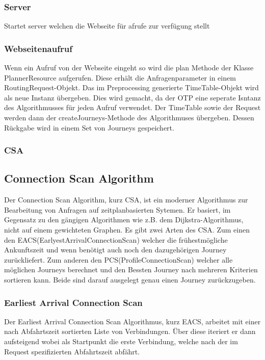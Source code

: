 \subsubsection{Server}
Startet server welchen die Webseite für afrufe zur verfügung stellt
\subsubsection{Webseitenaufruf}
Wenn ein Aufruf von der Webseite eingeht so wird die plan Methode der Klasse PlannerResource aufgerufen. Diese erhält die Anfragenparameter in einem RoutingRequest-Objekt. Das im Preprocessing generierte TimeTable-Objekt wird als neue Instanz übergeben. Dies wird gemacht, da der OTP eine seperate Isntanz des Algorithmusses für jeden Aufruf verwendet. Der TimeTable sowie der Request werden dann der createJourneys-Methode des Algorithmuses übergeben. Dessen Rückgabe wird in einem Set von Journeys gespeichert.

\subsubsection{CSA}
\subsection{Connection Scan Algorithm}
Der Connection Scan Algorithm, kurz CSA,  ist ein moderner Algorithmus zur Bearbeitung von Anfragen auf zeitplanbasierten Sytemen. Er basiert, im Gegensatz zu den gängigen Algorithmen wie z.B. dem Dijkstra-Algorithmus, nicht auf einem gewichteten Graphen. 
Es gibt zwei Arten des CSA. Zum einen den EACS(EarlyestArrivalConnectionScan) welcher die frühestmögliche Ankunftszeit und wenn benötigt auch noch den dazugehörigen Journey zurückliefert. Zum anderen den PCS(ProfileConnectionScan) welcher alle möglichen Journeys berechnet und den Bessten Journey nach mehreren Kriterien sortieren kann. Beide sind darauf ausgelegt genau einen Journey zurückzugeben.

\subsubsection{Earliest Arrival Connection Scan}
Der Earliest Arrival Connection Scan Algorithmus, kurz EACS, arbeitet mit einer nach Abfahrtszeit sortierten Liste von Verbindungen. Über diese iteriert er dann aufsteigend wobei als Startpunkt die erste Verbindung, welche nach der im Request spezifizierten Abfahrtszeit abfährt. 

